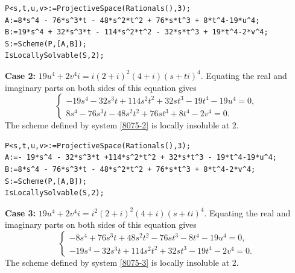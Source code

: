 \documentclass[a4paper,12pt,english,reqno]{amsart}
\begin{document}

\begin{lstlisting}
P<s,t,u,v>:=ProjectiveSpace(Rationals(),3);
A:=8*s^4 - 76*s^3*t - 48*s^2*t^2 + 76*s*t^3 + 8*t^4-19*u^4;
B:=19*s^4 + 32*s^3*t - 114*s^2*t^2 - 32*s*t^3 + 19*t^4-2*v^4;
S:=Scheme(P,[A,B]);
IsLocallySolvable(S,2);
\end{lstlisting}

{\bf Case 2:} $19u^4+2v^4i=i(2+i)^2(4+i)(s+ti)^4$.  Equating the real and imaginary parts on both sides of this equation gives
\begin{equation}\label{8075-2}
\begin{cases}
-19s^4 - 32s^3t + 114s^2t^2 + 32st^3 - 19t^4 - 19u^4=0,\\
8s^4 - 76s^3t - 48s^2t^2 + 76st^3 + 8t^4 - 2v^4=0.
\end{cases}
\end{equation}
The scheme defined by system \eqref{8075-2} is locally insoluble at $2$.


\begin{lstlisting}
P<s,t,u,v>:=ProjectiveSpace(Rationals(),3);
A:=- 19*s^4 - 32*s^3*t +114*s^2*t^2 + 32*s*t^3 - 19*t^4-19*u^4;
B:=8*s^4 - 76*s^3*t - 48*s^2*t^2 + 76*s*t^3 + 8*t^4-2*v^4;
S:=Scheme(P,[A,B]);
IsLocallySolvable(S,2);
\end{lstlisting}

{\bf Case 3:} $19u^4+2v^4i=i^2(2+i)^2(4+i)(s+ti)^4$.  Equating the real and imaginary parts on both sides of this equation gives
\begin{equation}\label{8075-3}
\begin{cases}
-8s^4 + 76s^3t + 48s^2t^2 - 76st^3 - 8t^4 - 19u^4=0,\\
-19s^4 - 32s^3t + 114s^2t^2 + 32st^3 - 19t^4 - 2v^4=0.
\end{cases}
\end{equation}
The scheme defined by system \eqref{8075-3} is locally insoluble at $2$.
\end{document}
